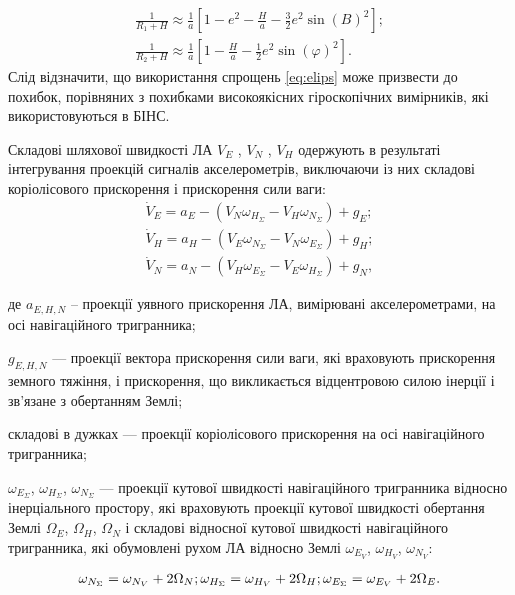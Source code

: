 \begin{equation} 
\label{eq:elips} 
\begin{array}{l} 
{\frac{1}{R_{1} +H} \approx \frac{1}{a}[1-e^{2} -\frac{H}{a} -\frac{3}{2} e^{2} \sin(B)^{2}];} \\ 
{\frac{1}{R_{2} +H} \approx \frac{1}{a}[1-\frac{H}{a} -\frac{1}{2} e^{2} \sin(\varphi)^{2}].} 
\end{array} 
\end{equation} 
Слід відзначити, що використання спрощень \eqref{eq:elips} може призвести 
до похибок, порівняних з похибками високоякісних гіроскопічних вимірників, які використовуються 
в БІНС.

Складові шляхової швидкості ЛА  $V_E$ , $V_N$ , $V_H$  одержують в результаті інтегрування 
проекцій сигналів акселерометрів, виключаючи із них  складові коріолісового прискорення  і 
прискорення сили ваги: 
\begin{equation} 
\label{eq:Vi} 
 \begin{array}{l} 
{\dot{V}_{E} =a_{E} -(V_{N} \omega_{H_{\Sigma }} -V_{H} \omega_{N_{\Sigma}} )+g_{E} ;} \\ 
{\dot{V}_{H} =a_{H} -(V_{E} \omega_{N_{\Sigma }} -V_{N} \omega_{E_{\Sigma}} )+g_{H} ;} \\ 
{\dot{V}_{N} =a_{N} -(V_{H} \omega_{E_{\Sigma }} -V_{E} \omega_{H_{\Sigma}} )+g_{N} ,} 
\end{array}
\end{equation} 
\begin{ESKDexplanation}
\item де $a_{E,H,N} $ -- проекції уявного прискорення ЛА, вимірювані акселерометрами, 
на осі навігаційного тригранника; 
\item $g_{E,H,N} $ --- проекції вектора прискорення 
сили ваги, які враховують прискорення земного тяжіння, і прискорення, що викликається 
відцентровою силою інерції і зв'язане з обертанням Землі; 
\item складові в дужках --- проекції коріолісового прискорення на осі навігаційного тригранника; 
\item $\omega_{E_{\Sigma}}$, $\omega_{H_{\Sigma}}$, $\omega_{N_{\Sigma}}$ --- проекції кутової 
швидкості навігаційного тригранника відносно інерціального простору, які враховують 
проекції кутової швидкості обертання Землі $\Omega_{E}$, $\Omega_{H}$, $\Omega_{N}$ 
і складові відносної кутової швидкості навігаційного тригранника, які обумовлені 
рухом ЛА відносно Землі $\omega_{E_{V}}$, $\omega_{H_{V}}$, $\omega_{N_{V}}$: 
\end{ESKDexplanation}
\[\omega_{N_{\Sigma }} =\omega_{N_{V}} +2\Omega_{N} ;\\ 
\omega_{H_{\Sigma }} =\omega_{H_{V}} +2\Omega_{H} ;\\
\omega_{E_{\Sigma }} =\omega_{E_{V}} +2\Omega_{E} .\] 

